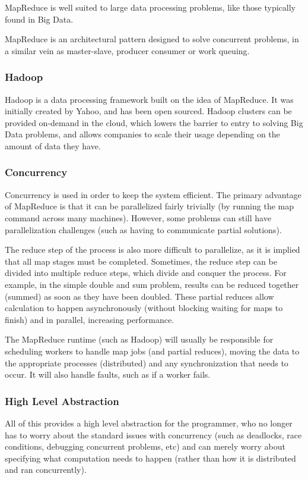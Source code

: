 \documentclass{article}
\begin{document}
{\begin{itemize}
MapReduce is well suited to large data processing problems, like those typically found in Big Data. 

MapReduce is an architectural pattern designed to solve concurrent problems, in a similar vein as master-slave, producer consumer or work queuing. 

\subsubsection{Hadoop}
Hadoop is a data processing framework built on the idea of MapReduce. It was initially created by Yahoo, and has been open sourced. Hadoop clusters can be provided on-demand in the cloud, which lowers the barrier to entry to solving Big Data problems, and allows companies to scale their usage depending on the amount of data they have. 

\subsubsection{Concurrency}
Concurrency is used in order to keep the system efficient. The primary advantage of MapReduce is that it can be parallelized fairly trivially (by running the map command across many machines). However, some problems can still have parallelization challenges (such as having to communicate partial solutions).

The reduce step of the process is also more difficult to parallelize, as it is implied that all map stages must be completed. Sometimes, the reduce step can be divided into multiple reduce steps, which divide and conquer the process. For example, in the simple double and sum problem, results can be reduced together (summed) as soon as they have been doubled. These partial reduces allow calculation to happen asynchronously (without blocking waiting for maps to finish) and in parallel, increasing performance.

The MapReduce runtime (such as Hadoop) will usually be responsible for scheduling workers to handle map jobs (and partial reduces), moving the data to the appropriate processes (distributed) and any synchronization that needs to occur. It will also handle faults, such as if a worker fails. 

\subsubsection{High Level Abstraction}
All of this provides a high level abstraction for the programmer, who no longer has to worry about the standard issues with concurrency (such as deadlocks, race conditions, debugging concurrent problems, etc) and can merely worry about specifying what computation needs to happen (rather than how it is distributed and ran concurrently). 


\end{itemize}}
\end{document}
